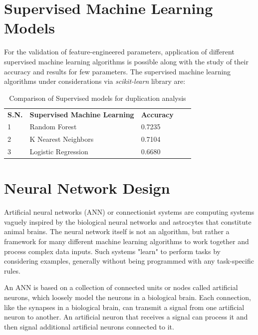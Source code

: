 \newpage

\section{Supervised Machine Learning Models}
For the validation of feature-engineered parameters, application of different supervised machine learning algorithms is possible along with the study of their accuracy and results for few parameters. The supervised machine learning algorithms under considerations via \textit{scikit-learn} library are:

\begin{table}[tbh]
\begin{center}
\begin{tabular}{|l|l|l|ll}
\cline{1-3}
\textbf{S.N.} & \textbf{Supervised Machine Learning} & \textbf{Accuracy} &  &  \\ \cline{1-3}
1             & Random Forest                        & 0.7235            &  &  \\ \cline{1-3}
2             & K Nearest Neighbors                  & 0.7104            &  &  \\ \cline{1-3}
3             & Logistic Regression                  & 0.6680            &  &  \\ \cline{1-3}
\end{tabular}
\caption{Comparison of Supervised models for duplication analysis}
\end{center}
\end{table}


\section{Neural Network Design}
Artificial neural networks (ANN) or connectionist systems are computing systems vaguely inspired by the biological neural networks and astrocytes that constitute animal brains. The neural network itself is not an algorithm, but rather a framework for many different machine learning algorithms to work together and process complex data inputs. Such systems "learn" to perform tasks by considering examples, generally without being programmed with any task-specific rules.

An ANN is based on a collection of connected units or nodes called artificial neurons, which loosely model the neurons in a biological brain. Each connection, like the synapses in a biological brain, can transmit a signal from one artificial neuron to another. An artificial neuron that receives a signal can process it and then signal additional artificial neurons connected to it.

